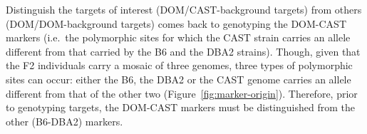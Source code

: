 
Distinguish the targets of interest (DOM/CAST-background targets) from others (DOM/DOM-background targets) comes back to genotyping the DOM-CAST markers (i.e.\ the polymorphic sites for which the CAST strain carries an allele different from that carried by the B6 and the DBA2 strains).
Though, given that the F2 individuals carry a mosaic of three genomes, three types of polymorphic sites can occur: either the B6, the DBA2 or the CAST genome carries an allele different from that of the other two (Figure~\ref{fig:marker-origin}).
Therefore, prior to genotyping targets, the DOM-CAST markers must be distinguished from the other (B6-DBA2) markers.



